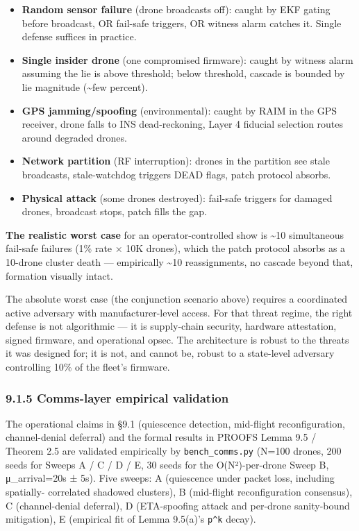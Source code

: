 \begin{itemize}
\tightlist
\item
  \textbf{Random sensor failure} (drone broadcasts off): caught by EKF
  gating before broadcast, OR fail-safe triggers, OR witness alarm
  catches it. Single defense suffices in practice.
\item
  \textbf{Single insider drone} (one compromised firmware): caught by
  witness alarm assuming the lie is above threshold; below threshold,
  cascade is bounded by lie magnitude (\textasciitilde few percent).
\item
  \textbf{GPS jamming/spoofing} (environmental): caught by RAIM in the
  GPS receiver, drone falls to INS dead-reckoning, Layer 4 fiducial
  selection routes around degraded drones.
\item
  \textbf{Network partition} (RF interruption): drones in the partition
  see stale broadcasts, stale-watchdog triggers DEAD flags, patch
  protocol absorbs.
\item
  \textbf{Physical attack} (some drones destroyed): fail-safe triggers
  for damaged drones, broadcast stops, patch fills the gap.
\end{itemize}

\textbf{The realistic worst case} for an operator-controlled show is
\textasciitilde10 simultaneous fail-safe failures (1\% rate × 10K
drones), which the patch protocol absorbs as a 10-drone cluster death
--- empirically \textasciitilde10 reassignments, no cascade beyond that,
formation visually intact.

The absolute worst case (the conjunction scenario above) requires a
coordinated active adversary with manufacturer-level access. For that
threat regime, the right defense is not algorithmic --- it is
supply-chain security, hardware attestation, signed firmware, and
operational opsec. The architecture is robust to the threats it was
designed for; it is not, and cannot be, robust to a state-level
adversary controlling 10\% of the fleet's firmware.

\subsubsection{9.1.5 Comms-layer empirical
validation}\label{comms-layer-empirical-validation}

The operational claims in §9.1 (quiescence detection, mid-flight
reconfiguration, channel-denial deferral) and the formal results in
PROOFS Lemma 9.5 / Theorem 2.5 are validated empirically by
\texttt{bench\_comms.py} (N=100 drones, 200 seeds for Sweeps A / C / D /
E, 30 seeds for the O(N²)-per-drone Sweep B, μ\_arrival=20s ± 5s). Five
sweeps: A (quiescence under packet loss, including spatially- correlated
shadowed clusters), B (mid-flight reconfiguration consensus), C
(channel-denial deferral), D (ETA-spoofing attack and per-drone
sanity-bound mitigation), E (empirical fit of Lemma 9.5(a)'s
\texttt{p\^{}k} decay).

